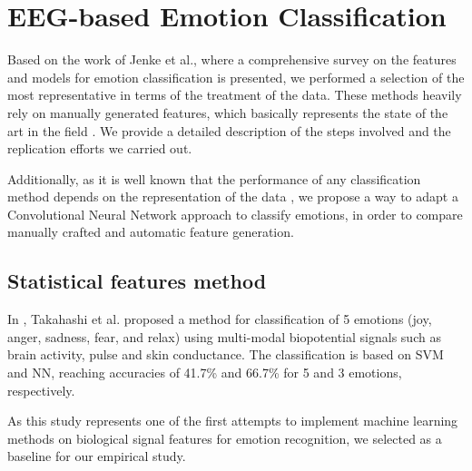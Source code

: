 \documentclass{sig-alternate}
\begin{document}
\section{EEG-based Emotion Classification }
\label{methods}
	
Based on the work of Jenke et al.\cite{jenke2014feature}, where a 
comprehensive survey on  the features and models for emotion 
classification is presented, we performed a selection of the most 
representative in terms of the treatment of the data. These methods 
heavily rely on manually generated features, which basically represents 
the state of the art in the field \cite{}. We provide a detailed description 
of the steps involved and the replication efforts we carried out. 

Additionally, as it is well known that the performance of any 
classification method depends on the representation of the data 
\cite{bengio2013representation}, 
we propose a way to adapt a Convolutional Neural 
Network approach to classify emotions, in order to compare  
manually crafted and automatic feature generation. 

\subsection{Statistical features method}	

In \cite{takahashi2004}, Takahashi et al. proposed a  method for 
 classification of 5 emotions (joy, anger, sadness, fear, and relax)
using multi-modal biopotential signals such as brain activity, pulse and
 skin conductance. The classification is based on SVM and NN, reaching 
 accuracies of  41.7\% and 66.7\% for 5 and 3 emotions, respectively. 
 
As this  study represents one of the first attempts to implement 
machine learning methods on biological signal features for emotion
 recognition, we selected as a baseline for our empirical study. 
 
%
%
 
\end{document}
